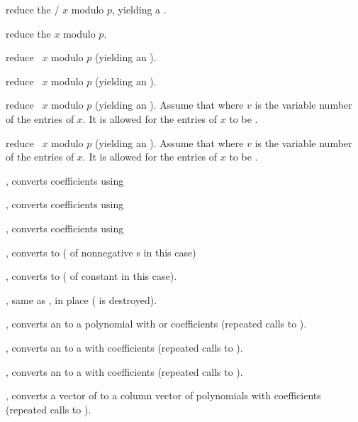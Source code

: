  reduce the /
$x$ modulo $p$, yielding a .

 reduce the  $x$ modulo $p$.

 reduce ~$x$ modulo $p$
(yielding an ).

 reduce ~$x$ modulo $p$
(yielding an ).

 reduce ~$x$ modulo $p$
(yielding an ). Assume that  where $v$ is
the variable number of the entries of $x$. It is allowed for the entries of
$x$ to be .

 reduce ~$x$ modulo $p$
(yielding an ). Assume that  where $v$ is
the variable number of the entries of $x$. It is allowed for the entries of $x$
to be .

, converts coefficients using 

, converts coefficients using 

, converts coefficients using 


, converts to  ( of nonnegative
s in this case)

, converts to  ( of constant
 in this case).

, same as , in place
( is destroyed).

, converts an  to a polynomial with
 or  coefficients (repeated calls to ).

, converts an  to a  with
 coefficients (repeated calls to ).

, converts an  to a  with
 coefficients (repeated calls to ).

, converts a vector of  to a column
vector of polynomials with  coefficients (repeated calls to
).

